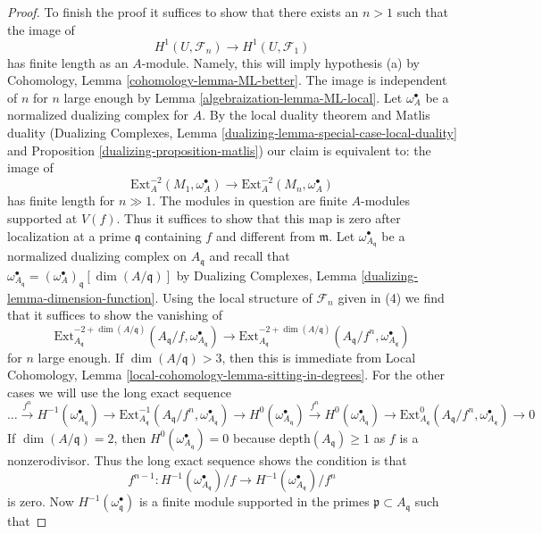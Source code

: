 \begin{proof}
\medskip\noindent
To finish the proof it suffices to show that there exists an $n > 1$
such that the image of
$$
H^1(U, \mathcal{F}_n) \longrightarrow H^1(U, \mathcal{F}_1)
$$
has finite length as an $A$-module. Namely, this will imply hypothesis (a)
by Cohomology, Lemma \ref{cohomology-lemma-ML-better}. The image is independent
of $n$ for $n$ large enough by Lemma \ref{algebraization-lemma-ML-local}.
Let $\omega_A^\bullet$ be a normalized dualizing complex for $A$.
By the local duality theorem and Matlis duality
(Dualizing Complexes, Lemma \ref{dualizing-lemma-special-case-local-duality}
and Proposition \ref{dualizing-proposition-matlis})
our claim is equivalent to: the image of
$$
\text{Ext}^{-2}_A(M_1, \omega_A^\bullet) \to
\text{Ext}^{-2}_A(M_n, \omega_A^\bullet)
$$
has finite length for $n \gg 1$. The modules in question are
finite $A$-modules supported at $V(f)$. Thus it suffices to show that this
map is zero after localization at a prime $\mathfrak q$
containing $f$ and different from $\mathfrak m$.
Let $\omega_{A_\mathfrak q}^\bullet$ be a normalized
dualizing complex on $A_\mathfrak q$ and recall that
$\omega_{A_\mathfrak q}^\bullet =
(\omega_A^\bullet)_\mathfrak q[\dim(A/\mathfrak q)]$ by
Dualizing Complexes, Lemma \ref{dualizing-lemma-dimension-function}.
Using the local structure of $\mathcal{F}_n$ given in (4)
we find that it suffices to show the vanishing of
$$
\text{Ext}^{-2 + \dim(A/\mathfrak q)}_{A_\mathfrak q}(
A_\mathfrak q/f, \omega_{A_\mathfrak q}^\bullet)
\to
\text{Ext}^{-2 + \dim(A/\mathfrak q)}_{A_\mathfrak q}(
A_\mathfrak q/f^n, \omega_{A_\mathfrak q}^\bullet)
$$
for $n$ large enough. If $\dim(A/\mathfrak q) > 3$, then this is immediate from
Local Cohomology, Lemma \ref{local-cohomology-lemma-sitting-in-degrees}.
For the other cases we will use the long exact sequence
$$
\ldots
\xrightarrow{f^n}
H^{-1}(\omega_{A_\mathfrak q}^\bullet)
\to
\text{Ext}^{-1}_{A_\mathfrak q}(
A_\mathfrak q/f^n, \omega_{A_\mathfrak q}^\bullet) \to
H^0(\omega_{A_\mathfrak q}^\bullet)
\xrightarrow{f^n}
H^0(\omega_{A_\mathfrak q}^\bullet)
\to
\text{Ext}^0_{A_\mathfrak q}(
A_\mathfrak q/f^n, \omega_{A_\mathfrak q}^\bullet) \to 0
$$
If $\dim(A/\mathfrak q) = 2$, then
$H^0(\omega_{A_\mathfrak q}^\bullet) = 0$
because $\text{depth}(A_\mathfrak q) \geq 1$ as
$f$ is a nonzerodivisor.
Thus the long exact sequence shows the condition is that
$$
f^{n - 1} :
H^{-1}(\omega_{A_\mathfrak q}^\bullet)/f \to
H^{-1}(\omega_{A_\mathfrak q}^\bullet)/f^n
$$
is zero. Now $H^{-1}(\omega^\bullet_\mathfrak q)$ is a finite
module supported in the primes $\mathfrak p \subset A_\mathfrak q$ such that

\end{proof}
